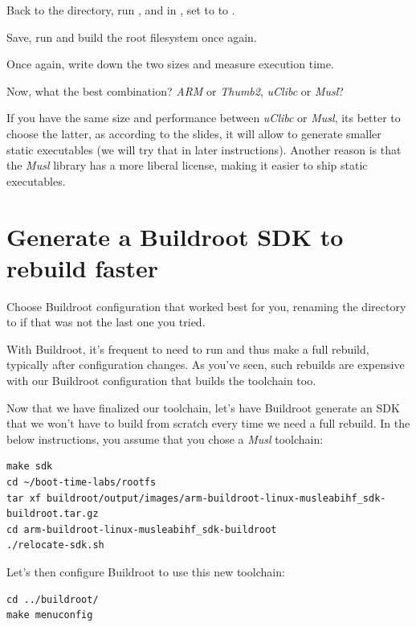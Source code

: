 Back to the  directory, run , and
in , set  to to .

Save, run  and build the root filesystem once again.

Once again, write down the two sizes and measure  execution
time.

Now, what the best combination? {\em ARM} or {\em Thumb2},
{\em uClibc} or {\em Musl}?

If you have the same size and performance between {\em uClibc} or {\em
Musl}, its better to choose the latter, as according to the slides, it
will allow to generate smaller static executables (we will try that
in later instructions). Another reason is that the {\em Musl} library
has a more liberal license, making it easier to ship static executables.

\section{Generate a Buildroot SDK to rebuild faster}

Choose Buildroot configuration that worked best for you, renaming
the directory to  if that was not the last one you
tried.

With Buildroot, it's frequent to need to run  and
thus make a full rebuild, typically after configuration changes.
As you've seen, such rebuilds are expensive with our Buildroot
configuration that builds the toolchain too.

Now that we have finalized our toolchain, let's have Buildroot generate
an SDK that we won't have to build from scratch every time we need a
full rebuild. In the below instructions, you assume that you chose a
{\em Musl} toolchain:

\begin{verbatim}
make sdk
cd ~/boot-time-labs/rootfs
tar xf buildroot/output/images/arm-buildroot-linux-musleabihf_sdk-buildroot.tar.gz
cd arm-buildroot-linux-musleabihf_sdk-buildroot
./relocate-sdk.sh
\end{verbatim}

Let's then configure Buildroot to use this new toolchain:
\begin{verbatim}
cd ../buildroot/
make menuconfig
\end{verbatim}

